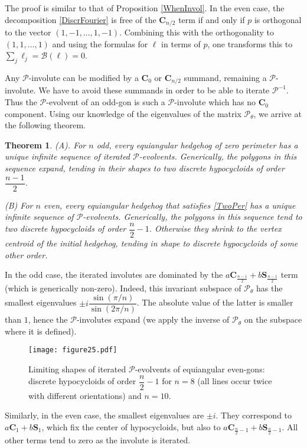 \documentclass[12pt]{article}
\makeatletter
\newtheorem{theorem}{Theorem}
\renewenvironment{proof}[1][\proofname] 
{\par\pushQED{\qed}\normalfont\topsep6\p@\@plus6\p@\relax\trivlist\item[\hskip\labelsep\bfseries#1\@addpunct{.}]\ignorespaces}{\popQED\endtrivlist\@endpefalse}
\newcommand{\B}{\mathcal{B}}
\newcommand{\Pev}{\mathcal{P}}
\makeatother
\begin{document}
\begin{proof}
The proof is similar to that of Proposition \ref{WhenInvol}. In the even case, the decomposition \eqref{DiscrFourier} is free of the $\mathbf{C}_{n/2}$ term if and only if $p$ is orthogonal to the vector $(1,-1, \ldots, 1, -1)$. Combining this with the orthogonality to $(1, 1, \ldots, 1)$ and using the formulas for $\ell$ in terms of $p$, one transforms this to $\sum_j \ell_j = \B(\ell) = 0$.
\end{proof}

Any  $\Pev$-involute  can be modified by a $\mathbf{C}_0$ or $\mathbf{C}_{n/2}$ summand, remaining a $\Pev$-involute. We have to avoid these summands in order to be able to iterate  $\Pev^{-1}$. Thus the $\Pev$-evolvent of an odd-gon is such a $\Pev$-involute which has no $\mathbf{C}_0$ component.  Using our knowledge of the eigenvalues of the matrix $\Pev_\theta$, we arrive at the following theorem.

\begin{theorem}
\label{nodd_Pinv_equi_limit}
{\rm (A)}. For $n$ odd, every equiangular hedgehog of zero perimeter has a unique infinite sequence of iterated $\Pev$-evolvents. Generically, the polygons in this sequence expand, tending in their shapes to two discrete hypocycloids of order $\dfrac{n-1}2$.\smallskip

{\rm (B)} For $n$ even, every equiangular hedgehog that satisfies \eqref{TwoPer} has a unique infinite sequence of $\Pev$-evolvents. Generically, the polygons in this sequence tend to two discrete hypocycloids of order $\dfrac{n}2 - 1$. Otherwise they shrink to the vertex centroid of the initial hedgehog, tending in shape to discrete hypocycloids of some other order.
\end{theorem}

\begin{proof} In the odd case, the iterated involutes are dominated by the $a\mathbf{C}_{\frac{n-1}2} + b\mathbf{S}_{\frac{n-1}2}$ term (which is generically non-zero). Indeed, this invariant subspace of $\Pev_\theta$ has the smallest eigenvalues $\pm i \dfrac{\sin(\pi/n)}{\sin(2\pi/n)}$. The absolute value of the latter is smaller than $1$, hence the $\Pev$-involutes expand (we apply the inverse of $\Pev_\theta$ on the subspace where it is defined).
	
\begin{figure}[htbp]
\centering
\texttt{[image: figure25.pdf]}
\caption{Limiting shapes of iterated $\Pev$-evolvents of equiangular even-gons: discrete hypocycloids of order $\dfrac{n}2 - 1$ for $n=8$ (all lines occur twice with different orientations) and $n=10$.}
\label{EvenShapeInvol}
\end{figure}

Similarly, in the even case, the smallest eigenvalues are $\pm i$. They correspond to $a\mathbf{C}_1 + b\mathbf{S}_1$, which fix the center of hypocycloids, but also to $a\mathbf{C}_{\frac{n}2 - 1} + b\mathbf{S}_{\frac{n}2 - 1}$. All other terms tend to zero as the involute is iterated.
\end{proof}
\end{document}
